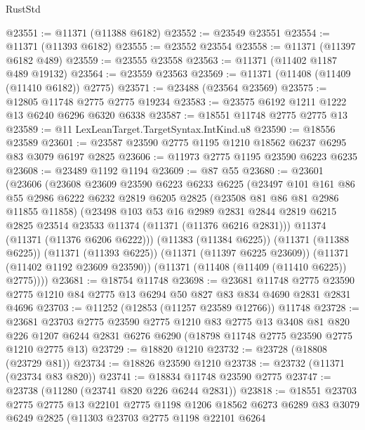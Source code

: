\begin{lexlean}{RustStd}
\begin{coremodule}
@23551 := @11371 (@11388 @6182)
@23552 := @23549 @23551
@23554 := @11371 (@11393 @6182)
@23555 := @23552 @23554
@23558 := @11371 (@11397 @6182 @489)
@23559 := @23555 @23558
@23563 := @11371 (@11402 @1187 @489 @19132)
@23564 := @23559 @23563
@23569 := @11371 (@11408 (@11409 (@11410 @6182)) @2775)
@23571 := @23488 (@23564 @23569)
@23575 := @12805 @11748 @2775 @2775 @19234
@23583 := @23575 @6192 @1211 @1222 @13 @6240 @6296 @6320 @6338
@23587 := @18551 @11748 @2775 @2775 @13
@23589 := @11 LexLeanTarget.TargetSyntax.IntKind.u8
@23590 := @18556 @23589
@23601 := @23587 @23590 @2775 @1195 @1210 @18562 @6237 @6295 @83 @3079 @6197 @2825
@23606 := @11973 @2775 @1195 @23590 @6223 @6235
@23608 := @23489 @1192 @1194
@23609 := @87 @55
@23680 := @23601
    (@23606
      (@23608
        @23609
        @23590
        @6223
        @6233
        @6225
        (@23497
          @101
          @161
          @86
          @55
          @2986
          @6222
          @6232
          @2819
          @6205
          @2825
          (@23508 @81 @86 @81 @2986 @11855 @11858)
          (@23498
            @103
            @53
            @16
            @2989
            @2831
            @2844
            @2819
            @6215
            @2825
            @23514
            @23533
            @11374
            (@11371 (@11376 @6216 @2831)))
          @11374
          (@11371 (@11376 @6206 @6222)))
        (@11383 (@11384 @6225))
        (@11371 (@11388 @6225))
        (@11371 (@11393 @6225))
        (@11371 (@11397 @6225 @23609))
        (@11371 (@11402 @1192 @23609 @23590))
        (@11371 (@11408 (@11409 (@11410 @6225)) @2775))))
@23681 := @18754 @11748
@23698 := @23681
    @11748
    @2775
    @23590
    @2775
    @1210
    @84
    @2775
    @13
    @6294
    @50
    @827
    @83
    @834
    @4690
    @2831
    @2831
    @4696
@23703 := @11252 (@12853 (@11257 @23589 @12766)) @11748
@23728 := @23681
    @23703
    @2775
    @23590
    @2775
    @1210
    @83
    @2775
    @13
    @3408
    @81
    @820
    @226
    @1207
    @6244
    @2831
    @6276
    @6290
    (@18798 @11748 @2775 @23590 @2775 @1210 @2775 @13)
@23729 := @18820 @1210
@23732 := @23728 (@18808 (@23729 @81))
@23734 := @18826 @23590 @1210
@23738 := @23732 (@11371 (@23734 @83 @820))
@23741 := @18834 @11748 @23590 @2775
@23747 := @23738 (@11280 (@23741 @820 @226 @6244 @2831))
@23818 := @18551
    @23703
    @2775
    @2775
    @13
    @22101
    @2775
    @1198
    @1206
    @18562
    @6273
    @6289
    @83
    @3079
    @6249
    @2825
    (@11303
      @23703
      @2775
      @1198
      @22101
      @6264

\end{coremodule}
\end{lexlean}

